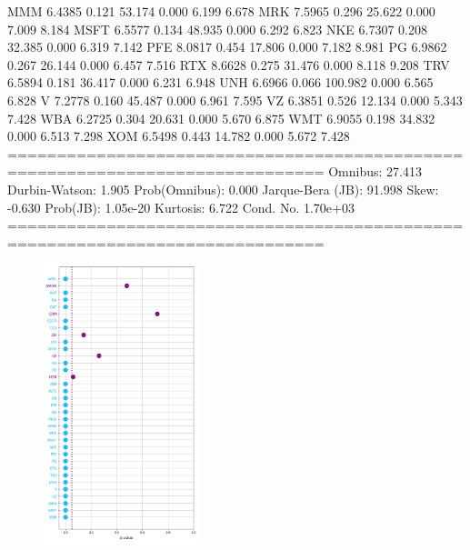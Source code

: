 \begin{solution}
\begin{ioutput}
MMM            6.4385      0.121     53.174      0.000       6.199       6.678
MRK            7.5965      0.296     25.622      0.000       7.009       8.184
MSFT           6.5577      0.134     48.935      0.000       6.292       6.823
NKE            6.7307      0.208     32.385      0.000       6.319       7.142
PFE            8.0817      0.454     17.806      0.000       7.182       8.981
PG             6.9862      0.267     26.144      0.000       6.457       7.516
RTX            8.6628      0.275     31.476      0.000       8.118       9.208
TRV            6.5894      0.181     36.417      0.000       6.231       6.948
UNH            6.6966      0.066    100.982      0.000       6.565       6.828
V              7.2778      0.160     45.487      0.000       6.961       7.595
VZ             6.3851      0.526     12.134      0.000       5.343       7.428
WBA            6.2725      0.304     20.631      0.000       5.670       6.875
WMT            6.9055      0.198     34.832      0.000       6.513       7.298
XOM            6.5498      0.443     14.782      0.000       5.672       7.428
==============================================================================
Omnibus:                       27.413   Durbin-Watson:                   1.905
Prob(Omnibus):                  0.000   Jarque-Bera (JB):               91.998
Skew:                          -0.630   Prob(JB):                     1.05e-20
Kurtosis:                       6.722   Cond. No.                     1.70e+03
==============================================================================
\end{ioutput}
\begin{figure}[htbp]
\centering
\includegraphics[width=0.4\textwidth]{figures/p-values}

\end{figure}
\end{solution}
